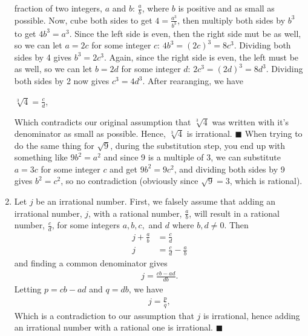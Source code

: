 \documentclass[12pt]{article}
\begin{document}
\begin{enumerate}
          fraction of two integers, $a$ and $b$: $\frac{a}{b}$, where $b$ is positive and 
          as small as possible. Now, cube both sides to get $4 = \frac{a^3}{b^3}$, then 
          multiply both sides by $b^3$ to get $4b^3 = a^3$. Since the left side is even, 
          then the right side mut be as well, so we can let $a = 2c$ for some integer $c$:
          $4b^3 = (2c)^3 = 8c^3$. Dividing both sides by 4 gives $b^3 = 2c^3$. Again, since 
          the right side is even, the left must be as well, so we can let $b = 2d$ for some
          integer $d$: $2c^3 = (2d)^3 = 8d^3$. Dividing both sides by 2 now gives $c^3 = 4d^3$.
          After rearanging, we have 
          \begin{center}
            $\sqrt[3]{4} = \frac{c}{d}$,
          \end{center}
          Which contradicts our original assumption that $\sqrt[3]{4}$ was written with
          it's denominator as small as possible. Hence, $\sqrt[3]{4}$ is irrational. \hfill $\blacksquare$
          \newline
          When trying to do the same thing for $\sqrt9$, during the substitution step,
          you end up with something like $9b^2 = a^2$ and since 9 is a multiple of 3, 
          we can substitute $a = 3c$ for some integer $c$ and get $9b^2 = 9c^2$, and 
          dividing both sides by 9 gives $b^2 = c^2$, so no contradiction (obviously 
          since $\sqrt9 = 3$, which is rational).
          \item Let $j$ be an irrational number. First, we falsely assume that adding an 
          irrational number, $j$, with a rational number, $\frac{a}{b}$, will result 
          in a rational number, $\frac{c}{d}$, for some integers $a,b,c, $ and $d$ 
          where $b, d \neq 0$. Then 
          \begin{align*}
            j + \frac{a}{b} &= \frac{c}{d}\\
            j &= \frac{c}{d} - \frac{a}{b} 
          \end{align*}
            and finding a common denominator gives
          \begin{align*}
            j = \frac{cb-ad}{db}.
          \end{align*}
          Letting $p = cb-ad$ and $q = db$, we have
          \begin{align*}
            j = \frac{p}{q},
          \end{align*}
          Which is a contradiction to our assumption that $j$ is irrational, hence 
          adding an irrational number with a rational one is irrational. \hfill $\blacksquare$\newline\newline

\end{enumerate}
\end{document}
